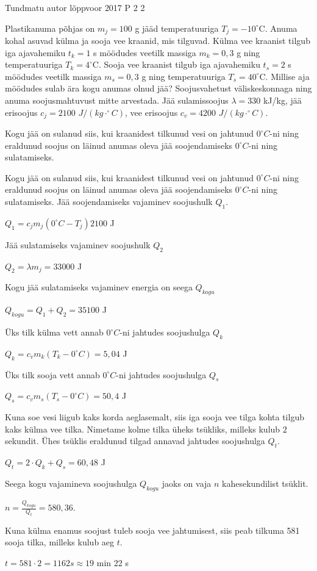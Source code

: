{Tundmatu autor} %
{lõppvoor} %
{2017} %
{P 2} %
{2} %
{

\ifStatement
Plastikanuma põhjas on $m_j = 100$ g jääd temperatuuriga $T_j = -10 ^{\circ}$C. Anuma kohal asuvad külma ja sooja vee kraanid, mis tilguvad. Külma vee kraanist tilgub iga ajavahemiku $t_k = 1$ s möödudes veetilk massiga $m_k = 0,3$ g ning temperatuuriga $T_k = 4 ^{\circ}$C. Sooja vee kraanist tilgub iga ajavahemiku $t_s = 2$ s möödudes veetilk massiga $m_s = 0,3$ g ning temperatuuriga $T_s = 40^{\circ}$C. Millise aja möödudes sulab ära kogu anumas olnud jää? Soojusvahetust väliskeskonnaga ning anuma soojusmahtuvust mitte arvestada. Jää sulamissoojus $\lambda = 330$ kJ/kg, jää erisoojus $c_j = 2100$ $J/(kg \cdot ^{\circ}C)$, vee erisoojus $c_v = 4200$ $J/(kg \cdot ^{\circ}C)$.
\fi

\ifHint
Kogu jää on sulanud siis, kui kraanidest tilkunud vesi on jahtunud $0 ^{\circ}C$-ni ning eraldunud soojus on läinud anumas oleva jää soojendamiseks $0 ^{\circ}C$-ni ning sulatamiseks.
\fi

\ifSolution
Kogu jää on sulanud siis, kui kraanidest tilkunud vesi on jahtunud $0 ^{\circ}C$-ni ning eraldunud soojus on läinud anumas oleva jää soojendamiseks $0 ^{\circ}C$-ni ning sulatamiseks.
Jää soojendamiseks vajaminev soojushulk $Q_1$.
\begin{center}
$Q_1 = c_j m_j (0 ^{\circ}C - T_j)2100$ J
\end{center}
Jää sulatamiseks vajaminev soojushulk $Q_2$
\begin{center}
$Q_2 = \lambda m_j = 33 000$ J
\end{center}
Kogu jää sulatamiseks vajaminev energia on seega $Q_{kogu}$
\begin{center}
$Q_{kogu} = Q_1 + Q_2 = 35 100$ J
\end{center}
Üks tilk külma vett annab $0 ^{\circ}C$-ni jahtudes soojushulga $Q_k$
\begin{center}
$Q_k = c_v m_k (T_k - 0 ^{\circ}C) = 5,04$ J
\end{center}
Üks tilk sooja vett annab $0 ^{\circ}C$-ni jahtudes soojushulga $Q_s$
\begin{center}
$Q_s = c_v m_s(T_s - 0 ^{\circ}C) = 50,4$ J
\end{center}
Kuna soe vesi liigub kaks korda aeglasemalt, siis iga sooja vee tilga kohta tilgub kaks külma vee tilka. Nimetame kolme tilka üheks tsükliks, milleks kulub $2$ sekundit. Ühes tsüklis eraldunud tilgad annavad jahtudes soojushulga $Q_t$.
\begin{center}
$Q_t = 2 \cdot Q_k + Q_s = 60,48$ J
\end{center}
Seega kogu vajamineva soojushulga $Q_{kogu}$ jaoks on vaja $n$ kahesekundilist tsüklit.
\begin{center}
$n = \frac{Q_{kogu}}{Q_t} = 580,36$.
\end{center}
Kuna külma enamus soojust tuleb sooja vee jahtumisest, siis peab tilkuma 581 sooja tilka, milleks kulub aeg $t$.
\begin{center}
$t = 581 \cdot 2 = 1162 s \approx 19$ min 22 s
\end{center}
\fi
}